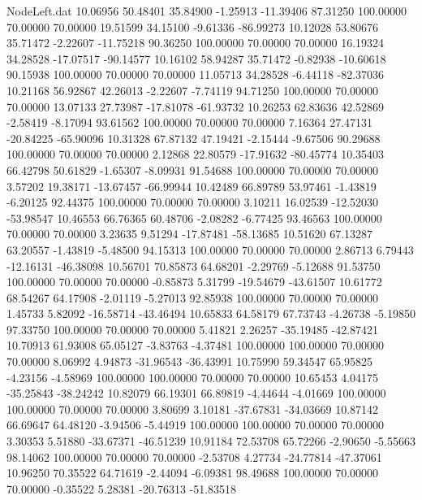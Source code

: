 \begin{filecontents}{NodeLeft.dat}
  10.06956   50.48401   35.84900    -1.25913  -11.39406   87.31250  100.00000   70.00000   70.00000   19.51599   34.15100   -9.61336  -86.99273
  10.12028   53.80676   35.71472    -2.22607  -11.75218   90.36250  100.00000   70.00000   70.00000   16.19324   34.28528  -17.07517  -90.14577
  10.16102   58.94287   35.71472    -0.82938  -10.60618   90.15938  100.00000   70.00000   70.00000   11.05713   34.28528   -6.44118  -82.37036
  10.21168   56.92867   42.26013    -2.22607   -7.74119   94.71250  100.00000   70.00000   70.00000   13.07133   27.73987  -17.81078  -61.93732
  10.26253   62.83636   42.52869    -2.58419   -8.17094   93.61562  100.00000   70.00000   70.00000    7.16364   27.47131  -20.84225  -65.90096
  10.31328   67.87132   47.19421    -2.15444   -9.67506   90.29688  100.00000   70.00000   70.00000    2.12868   22.80579  -17.91632  -80.45774
  10.35403   66.42798   50.61829    -1.65307   -8.09931   91.54688  100.00000   70.00000   70.00000    3.57202   19.38171  -13.67457  -66.99944
  10.42489   66.89789   53.97461    -1.43819   -6.20125   92.44375  100.00000   70.00000   70.00000    3.10211   16.02539  -12.52030  -53.98547
  10.46553   66.76365   60.48706    -2.08282   -6.77425   93.46563  100.00000   70.00000   70.00000    3.23635    9.51294  -17.87481  -58.13685
  10.51620   67.13287   63.20557    -1.43819   -5.48500   94.15313  100.00000   70.00000   70.00000    2.86713    6.79443  -12.16131  -46.38098
  10.56701   70.85873   64.68201    -2.29769   -5.12688   91.53750  100.00000   70.00000   70.00000   -0.85873    5.31799  -19.54679  -43.61507
  10.61772   68.54267   64.17908    -2.01119   -5.27013   92.85938  100.00000   70.00000   70.00000    1.45733    5.82092  -16.58714  -43.46494
  10.65833   64.58179   67.73743    -4.26738   -5.19850   97.33750  100.00000   70.00000   70.00000    5.41821    2.26257  -35.19485  -42.87421
  10.70913   61.93008   65.05127    -3.83763   -4.37481  100.00000  100.00000   70.00000   70.00000    8.06992    4.94873  -31.96543  -36.43991
  10.75990   59.34547   65.95825    -4.23156   -4.58969  100.00000  100.00000   70.00000   70.00000   10.65453    4.04175  -35.25843  -38.24242
  10.82079   66.19301   66.89819    -4.44644   -4.01669  100.00000  100.00000   70.00000   70.00000    3.80699    3.10181  -37.67831  -34.03669
  10.87142   66.69647   64.48120    -3.94506   -5.44919  100.00000  100.00000   70.00000   70.00000    3.30353    5.51880  -33.67371  -46.51239
  10.91184   72.53708   65.72266    -2.90650   -5.55663   98.14062  100.00000   70.00000   70.00000   -2.53708    4.27734  -24.77814  -47.37061
  10.96250   70.35522   64.71619    -2.44094   -6.09381   98.49688  100.00000   70.00000   70.00000   -0.35522    5.28381  -20.76313  -51.83518

\end{filecontents}
